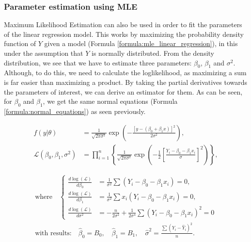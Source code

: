 \subsubsection{Parameter estimation using MLE}

Maximum Likelihood Estimation can also be used in order to fit the parameters of the linear regression model.
This works by maximizing the probability density function of $Y$ given a model (Formula \ref{formula:mle_linear_regression}), in this under the assumption that $Y$ is normally distributed.
From the density distribution, we see that we have to estimate three parameters: $\beta_0$, $\beta_1$ and $\sigma^2$.
Although, to do this, we need to calculate the loglikelihood, as maximizing a sum is far easier than maximizing a product.
By taking the partial derivatives towards the parameters of interest, we can derive an estimator for them.
As can be seen, for $\beta_0$ and $\beta_1$, we get the same normal equations (Formula \ref{formula:normal_equations}) as seen previously.

\begin{equation}
    \begin{aligned}
        f(y|\theta) &= \frac{1}{\sqrt{2\pi\sigma^2}} \exp\left(- \frac{\left[y - (\beta_0 + \beta_1x)\right]^2}{2\sigma^2}\right), \\[10pt]
        \mathcal{L}(\beta_0, \beta_1, \sigma^2) &= \prod_{i=1}^n \left\{ \frac{1}{\sqrt{2\pi\sigma^2}} \exp\left(-\frac{1}{2} \left[\frac{Y_i-\beta_0-\beta_1x_i}{\sigma}\right]^2\right)\right\},
    \end{aligned}
    \label{formula:mle_linear_regression}
\end{equation}

\begin{equation}
    \begin{aligned}
    \text{where} \quad 
    \left\{
    \begin{aligned}
        \frac{d \log (\mathcal{L})}{d\beta_0} &= \frac{1}{\sigma^2} \sum\left(Y_i - \beta_0 - \beta_1x_i\right) = 0, \\
        \frac{d \log (\mathcal{L})}{d\beta_1} &= \frac{1}{\sigma^2} \sum x_i \left(Y_i - \beta_0 - \beta_1x_i\right) = 0, \\
        \frac{d \log (\mathcal{L})}{d\sigma^2} &= -\frac{n}{2\sigma^2} + \frac{1}{2\sigma^4} \sum \left(Y_i - \beta_0 - \beta_1 x_i\right)^2 = 0
    \end{aligned}
    \right. \\[10pt]
    \text{with results:} \quad \hat{\beta}_0 = B_0, \quad \hat{\beta}_1 = B_1, \quad \hat{\sigma}^2 = \frac{\sum(Y_i - \hat{Y}_i)^2}{n}.
    \end{aligned}
\end{equation}
    
